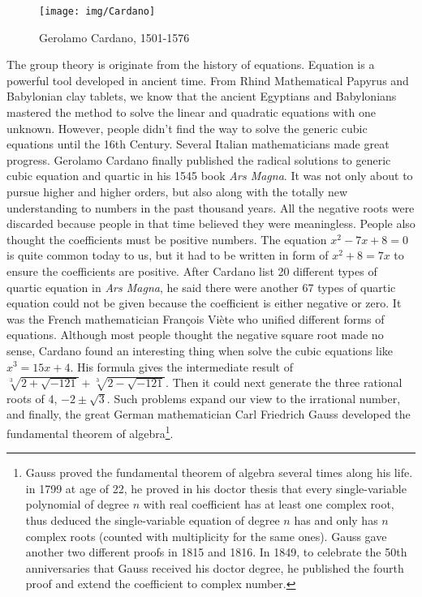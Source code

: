 \documentclass[b5paper]{article}
\begin{document}
\begin{figure}[htbp]
 \centering
 \texttt{[image: img/Cardano]}
 \captionsetup{labelformat=empty}
 \caption{Gerolamo Cardano, 1501-1576}
 \label{fig:Cardano}
\end{figure}


The group theory is originate from the history of equations. Equation is a powerful tool developed in ancient time. From Rhind Mathematical Papyrus and Babylonian clay tablets, we know that the ancient Egyptians and Babylonians mastered the method to solve the linear and quadratic equations with one unknown. However, people didn't find the way to solve the generic cubic equations until the 16th Century. Several Italian mathematicians made great progress. Gerolamo Cardano finally published the radical solutions to generic cubic equation and quartic in his 1545 book {\em Ars Magna}. It was not only about to pursue higher and higher orders, but also along with the totally new understanding to numbers in the past thousand years. All the negative roots were discarded because people in that time believed they were meaningless. People also thought the coefficients must be positive numbers. The equation $x^2 - 7x + 8 = 0$ is quite common today to us, but it had to be written in form of $x^2 + 8 = 7x$ to ensure the coefficients are positive. After Cardano list 20 different types of quartic equation in {\em Ars Magna}, he said there were another 67 types of quartic equation could not be given because the coefficient is either negative or zero\cite{HanXueTao2012}. It was the French mathematician François Viète who unified different forms of equations. Although most people thought the negative square root made no sense, Cardano found an interesting thing when solve the cubic equations like $x^3 = 15x +4$. His formula gives the intermediate result of $\sqrt[3]{2 + \sqrt{-121}} + \sqrt[3]{2 - \sqrt{-121}}$. Then it could next generate the three rational roots of 4, $-2 \pm \sqrt{3}$. Such problems expand our view to the irrational number, and finally, the great German mathematician Carl Friedrich Gauss developed the fundamental theorem of algebra\footnote{Gauss proved the fundamental theorem of algebra several times along his life. in 1799 at age of 22, he proved in his doctor thesis that every single-variable polynomial of degree $n$ with real coefficient has at least one complex root, thus deduced the single-variable equation of degree $n$ has and only has $n$ complex roots (counted with multiplicity for the same ones). Gauss gave another two different proofs in 1815 and 1816. In 1849, to celebrate the 50th anniversaries that Gauss received his doctor degree, he published the fourth proof and extend the coefficient to complex number.}.
\end{document}
